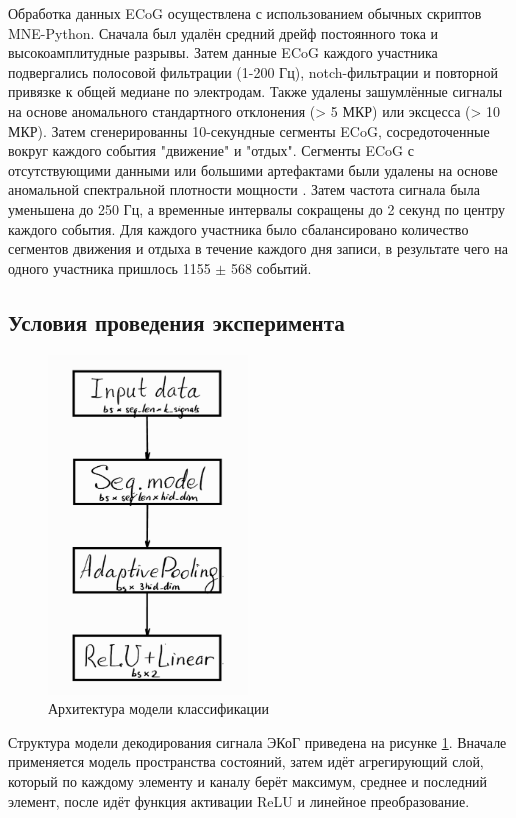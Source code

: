 \documentclass[a4paper, 12pt]{article}
\begin{document}
	Обработка данных ECoG осуществлена с использованием обычных скриптов MNE-Python. 
	Сначала был удалён средний дрейф постоянного тока и высокоамплитудные разрывы. Затем данные ECoG каждого участника подвергались полосовой фильтрации (1-200 Гц), notch-фильтрации и повторной привязке к общей медиане по электродам. 
	Также удалены зашумлённые сигналы на основе аномального стандартного отклонения (> 5 МКР) или эксцесса (> 10 МКР). 
	Затем сгенерированны 10-секундные сегменты ECoG, сосредоточенные вокруг каждого события "движение" и "отдых". 
	Сегменты ECoG с отсутствующими данными или большими артефактами были удалены на основе аномальной спектральной плотности мощности \citep{peterson2021behavioral}.
	Затем частота сигнала была уменьшена до 250 Гц, а временные интервалы сокращены до 2 секунд по центру каждого события.
	Для каждого участника было сбалансировано количество сегментов движения и отдыха в течение каждого дня записи, в результате чего на одного участника пришлось 1155 $\pm$ 568 событий.
	
	\subsection{Условия проведения эксперимента}
	\begin{figure}[bhtp]
		\centering
		\includegraphics[height=9cm]{seq-model.jpg}
		\caption{Архитектура модели классификации}
		\label{fig:seq-model}
	\end{figure}
	
	Структура модели декодирования сигнала ЭКоГ приведена на рисунке \ref{fig:seq-model}.
	Вначале применяется модель пространства состояний, затем идёт агрегирующий слой, который по каждому элементу и каналу берёт максимум, среднее и последний элемент, после идёт функция активации ReLU и линейное преобразование.
	
\end{document}
